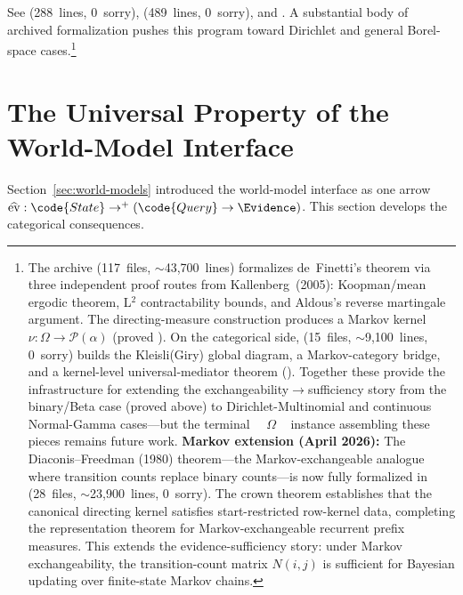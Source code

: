\documentclass[11pt,openany]{report}
\begin{document}
See
(288~lines, 0~sorry),
(489~lines, 0~sorry), and
.
A substantial body of archived formalization pushes this program toward
Dirichlet and general Borel-space cases.\footnote{The
 archive (117~files,
${\sim}$43{,}700~lines) formalizes de~Finetti's theorem via three
independent proof routes from Kallenberg~(2005): Koopman/mean ergodic
theorem, L$^2$ contractability bounds, and Aldous's reverse martingale
argument.  The directing-measure construction produces a Markov kernel
$\nu : \Omega \to \mathcal{P}(\alpha)$ (proved ).
On the categorical side, 
(15~files, ${\sim}$9{,}100~lines, 0~sorry) builds the Kleisli(Giry)
global diagram, a Markov-category bridge, and a kernel-level
universal-mediator theorem
().  Together
these provide the infrastructure for extending the
exchangeability$\to$sufficiency story from the binary/Beta case
(proved above) to Dirichlet-Multinomial and continuous Normal-Gamma
cases---but the terminal ~~$\Omega$%
\code{)}~ instance assembling these pieces remains future
work.  \textbf{Markov extension (April 2026):} The Diaconis--Freedman
(1980) theorem---the Markov-exchangeable analogue where transition
counts replace binary counts---is now fully formalized in
 (28~files,
${\sim}$23{,}900~lines, 0~sorry).  The crown theorem
 establishes
that the canonical directing kernel satisfies start-restricted
row-kernel data, completing the representation theorem for
Markov-exchangeable recurrent prefix measures.  This extends the
evidence-sufficiency story: under Markov exchangeability, the
transition-count matrix $N(i,j)$ is sufficient for Bayesian updating
over finite-state Markov chains.}


\section{The Universal Property of the World-Model Interface}
\label{sec:universal-property}

Section~\ref{sec:world-models} introduced the world-model interface as
one arrow $\widehat{\mathrm{ev}} : \code{State} \to^+
(\code{Query} \to \Evidence)$.  This section develops the categorical
consequences.
\end{document}
